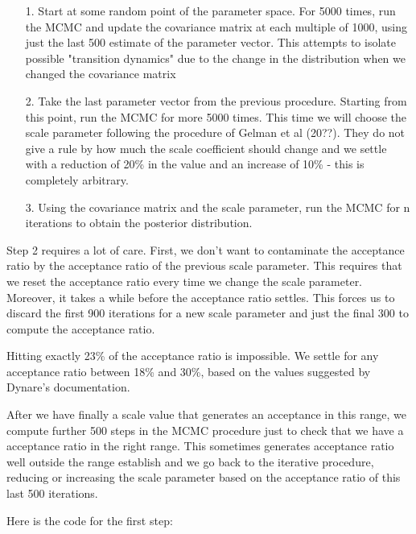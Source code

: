 \documentclass[12pt,a4paper]{article}
\begin{document}
\begin{itemize}
\item[1. ] Start at some random point of the parameter space. For 5000 times, run the MCMC and update the covariance matrix at each multiple of 1000, using just the last 500 estimate of the parameter vector. This attempts to isolate possible "transition dynamics" due to the change in the distribution when we changed the covariance matrix


\item[2. ] Take the last parameter vector from the previous procedure. Starting from this point, run the MCMC for more 5000 times. This time we will choose the scale parameter following the procedure of Gelman et al (20??). They do not give a rule by how much the scale coefficient should change and we settle with a reduction of 20\% in the value and an increase of 10\% - this is completely arbitrary.


\item[3. ] Using the covariance matrix and the scale parameter, run the MCMC for n iterations to obtain the posterior distribution.

\end{itemize}
Step 2 requires a lot of care. First, we don't want to contaminate the acceptance ratio by the acceptance ratio of the previous scale parameter. This requires that we reset the acceptance ratio every time we change the scale parameter. Moreover, it takes a while before the acceptance ratio settles. This forces us to discard the first 900 iterations for a new scale parameter and just the final 300 to compute the acceptance ratio.

Hitting exactly 23\% of the acceptance ratio is impossible. We settle for any acceptance ratio between 18\% and 30\%, based on the values suggested by Dynare's documentation.

After we have finally a scale value that generates an acceptance in this range, we compute further 500 steps in the MCMC procedure just to check that we have a acceptance ratio in the right range. This sometimes generates acceptance ratio well outside the range establish and we go back to the iterative procedure, reducing or increasing the scale parameter based on the acceptance ratio of this last 500 iterations.

Here is the code for the first step:
\end{document}
